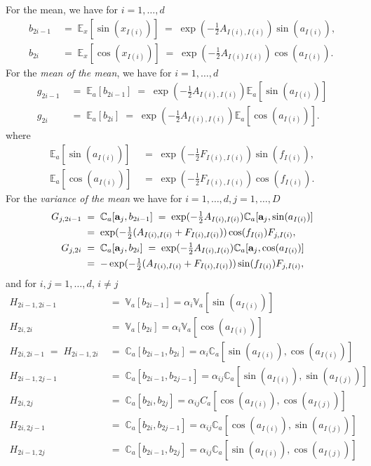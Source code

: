 \documentclass{article}
\newcommand{\bfa}{{\bf a}}
\newcommand{\E}{{\mathbb E}}
\newcommand{\V}{{\mathbb V}}
\newcommand{\C}{{\mathbb C}}
\begin{document}
For the mean, we have for $i=1,\ldots,d$
\[
\begin{split}
b_{2i-1}\;&=\;\E_x[\sin(x_{I(i)})]\;=\;\exp(-\tfrac{1}{2}A_{I(i),I(i)})\sin(a_{I(i)}),\\
b_{2i}\;&=\;\E_x[\cos(x_{I(i)})]\;=\;\exp(-\tfrac{1}{2}A_{I(i)I(i)})\cos(a_{I(i)}).
\end{split}
\]
For the \emph{mean of the mean}, we have for $i=1,\ldots,d$
\[
\begin{split}
g_{2i-1}\;&=\;\E_{a}[b_{2i-1}]\;=\;\exp(-\tfrac{1}{2}A_{I(i),I(i)})\E_{a}[\sin(a_{I(i)})] \\
g_{2i}\;&=\;\E_{a}[b_{2i}]\;=\;\exp(-\tfrac{1}{2}A_{I(i),I(i)})\E_{a}[\cos(a_{I(i)})].
\end{split}
\]
where
\[
\begin{split}
 \E_{a}[\sin(a_{I(i)})]\;&=\;\exp(-\tfrac{1}{2}F_{I(i),I(i)})\sin(f_{I(i)}),\\
 \E_{a}[\cos(a_{I(i)})]\;&=\;\exp(-\tfrac{1}{2}F_{I(i),I(i)})\cos(f_{I(i)}).
\end{split}
\]
For the \emph{variance of the mean} we have for $i=1,\ldots,d,j=1,\ldots,D$
\[
\begin{split}
 G_{j,2i-1}\;&=\;\C_a[\bfa_j,b_{2i-1}]\;=\;\exp(-\tfrac{1}{2}A_{I(i),I(i)})\C_a[\bfa_j,\sin(a_{I(i)})]\\
 \;&=\;\exp(-\tfrac{1}{2}(A_{I(i),I(i)}+F_{I(i),I(i)}))\cos(f_{I(i)})F_{j,I(i)},\\  
 G_{j,2i}\;&=\;\C_a[\bfa_j,b_{2i}]\;=\;\exp(-\tfrac{1}{2}A_{I(i),I(i)})\C_a[\bfa_j,\cos(a_{I(i)})]\\
 \;&=\;-\exp(-\tfrac{1}{2}(A_{I(i),I(i)}+F_{I(i),I(i)}))\sin(f_{I(i)})F_{j,I(i)},
\end{split}
\]
and for $i,j=1,\ldots,d$, $i\neq j$
\[
\begin{split}
 H_{2i-1,2i-1}\;&=\;\V_a[b_{2i-1}]=\alpha_{i}\V_{a}[\sin(a_{I(i)})]\\
 H_{2i,2i}\;&=\;\V_a[b_{2i}]=\alpha_{i}\V_{a}[\cos(a_{I(i)})]\\
 H_{2i,2i-1}\;=\;H_{2i-1,2i}\;&=\;\C_a[b_{2i-1},b_{2i}]=\alpha_{i}\C_a[\sin(a_{I(i)}),\cos(a_{I(i)})]\\
 H_{2i-1,2j-1}\;&=\;\C_a[b_{2i-1},b_{2j-1}]=\alpha_{ij}\C_a[\sin(a_{I(i)}),\sin(a_{I(j)})]\\
 H_{2i,2j}\;&=\;\C_a[b_{2i},b_{2j}]=\alpha_{ij}C_a[\cos(a_{I(i)}),\cos(a_{I(j)})]\\
 H_{2i,2j-1}\;&=\;\C_a[b_{2i},b_{2j-1}]=\alpha_{ij}\C_a[\cos(a_{I(i)}),\sin(a_{I(j)})]\\
 H_{2i-1,2j}\;&=\;\C_a[b_{2i-1},b_{2j}]=\alpha_{ij}\C_a[\sin(a_{I(i)}),\cos(a_{I(j)})]
\end{split}
\]
\end{document}
